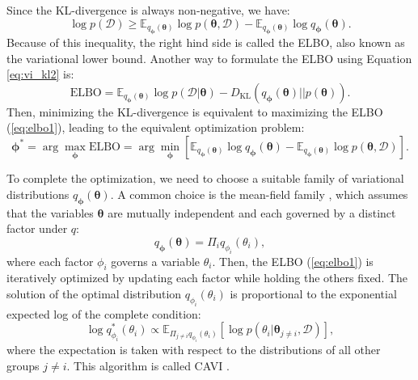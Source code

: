 Since the \ac{KL}-divergence is always non-negative, we have:
\begin{equation}
    \label{eq:elbo1}
    \log p(\mathcal{D}) \geq \mathbb{E}_{q_{\boldsymbol{\phi}}(\boldsymbol{\theta})}\log p(\boldsymbol{\theta}, \mathcal{D})-\mathbb{E}_{q_{\boldsymbol{\phi}}(\boldsymbol{\theta})}\log q_{\boldsymbol{\phi}}(\boldsymbol{\theta}).
\end{equation}
Because of this inequality, the right hind side is called the \acf{ELBO}, also known as the variational lower bound. Another way to formulate the \ac{ELBO} using Equation \ref{eq:vi_kl2} is:
\begin{equation}
    \label{eq:elbo2}
    \text{ELBO} = \mathbb{E}_{q_{\boldsymbol{\phi}}(\boldsymbol{\theta})}\log p(\mathcal{D}|\boldsymbol{\theta}) - D_{\text{KL}}(q_{\boldsymbol{\phi}}(\boldsymbol{\theta})||p(\boldsymbol{\theta})). 
\end{equation}
Then, minimizing the \ac{KL}-divergence is equivalent to maximizing the \ac{ELBO} (\ref{eq:elbo1}), leading to the equivalent optimization problem:
\begin{equation}
    \label{eq:vi_opt}
    \boldsymbol{\phi}^* = \arg\max_{\boldsymbol{\phi}} \text{ELBO} = \arg\min_{\boldsymbol{\phi}}[\mathbb{E}_{q_{\boldsymbol{\phi}}(\boldsymbol{\theta})}\log q_{\boldsymbol{\phi}}(\boldsymbol{\theta})-\mathbb{E}_{q_{\boldsymbol{\phi}}(\boldsymbol{\theta})}\log p(\boldsymbol{\theta}, \mathcal{D})].
\end{equation}

To complete the optimization, we need to choose a suitable family of variational distributions $q_{\boldsymbol{\phi}}(\boldsymbol{\theta})$. A common choice is the mean-field family \citep{bishop2006}, which assumes that the variables $\boldsymbol{\theta}$ are mutually independent and each governed by a distinct factor under $q$:
\begin{equation}
    q_{\boldsymbol{\phi}}(\boldsymbol{\theta}) = \Pi_{i} q_{\phi_i}(\theta_i),
\end{equation}
where each factor $\phi_i$ governs a variable $\theta_i$. Then, the \ac{ELBO} (\ref{eq:elbo1}) is iteratively optimized by updating each factor while holding the others fixed. The solution of the optimal distribution $q_{\phi_i}(\theta_i)$ is proportional to the exponential expected log of the complete condition:
\begin{equation}
    \log q_{\phi_i}^*(\theta_i) \propto \mathbb{E}_{\Pi_{j\neq i}q_{\phi_i}(\theta_i)}[\log p(\theta_i|\boldsymbol{\theta}_{j\neq i}, \mathcal{D})],
\end{equation}
where the expectation is taken with respect to the distributions of all other groups $j \neq i$. This algorithm is called \ac{CAVI} \citep{bishop2006}. 


